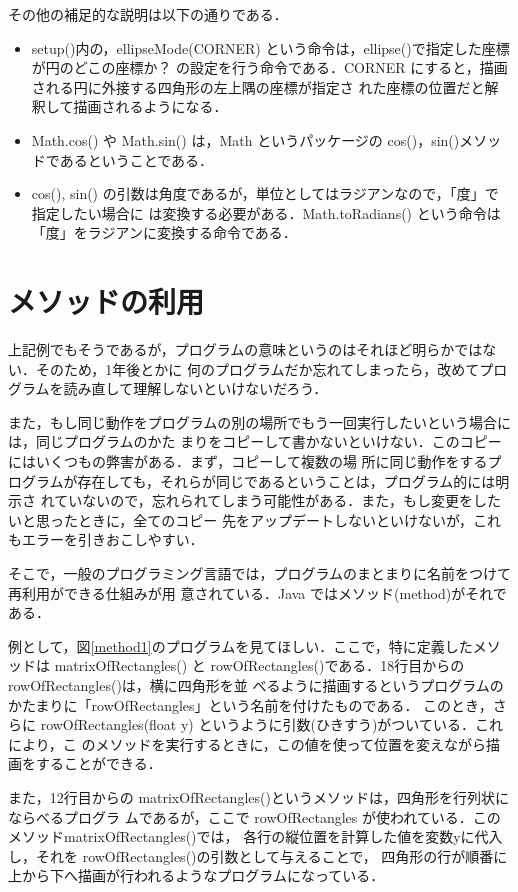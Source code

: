 \documentclass[a4paper,xelatex,ja=standard]{bxjsarticle}
\begin{document}
その他の補足的な説明は以下の通りである．
\begin{itemize}
  \item setup()内の，ellipseMode(CORNER) という命令は，ellipse()で指定した座標が円のどこの座標か？
    の設定を行う命令である．CORNER にすると，描画される円に外接する四角形の左上隅の座標が指定さ
    れた座標の位置だと解釈して描画されるようになる．
  \item Math.cos() や Math.sin() は，Math というパッケージの cos()，sin()メソッドであるということである．
  \item cos(), sin() の引数は角度であるが，単位としてはラジアンなので，「度」で指定したい場合に
    は変換する必要がある．Math.toRadians() という命令は「度」をラジアンに変換する命令である．
\end{itemize}

\section{メソッドの利用}


上記例でもそうであるが，プログラムの意味というのはそれほど明らかではない．そのため，1年後とかに
何のプログラムだか忘れてしまったら，改めてプログラムを読み直して理解しないといけないだろう．

また，もし同じ動作をプログラムの別の場所でもう一回実行したいという場合には，同じプログラムのかた
まりをコピーして書かないといけない．このコピーにはいくつもの弊害がある．まず，コピーして複数の場
所に同じ動作をするプログラムが存在しても，それらが同じであるということは，プログラム的には明示さ
れていないので，忘れられてしまう可能性がある．また，もし変更をしたいと思ったときに，全てのコピー
先をアップデートしないといけないが，これもエラーを引きおこしやすい．

そこで，一般のプログラミング言語では，プログラムのまとまりに名前をつけて再利用ができる仕組みが用
意されている．Java ではメソッド(method)がそれである．

例として，図\ref{method1}のプログラムを見てほしい．ここで，特に定義したメソッドは
matrixOfRectangles() と rowOfRectangles()である．18行目からのrowOfRectangles()は，横に四角形を並
べるように描画するというプログラムのかたまりに「rowOfRectangles」という名前を付けたものである．
このとき，さらに rowOfRectangles(float y) というように引数(ひきすう)がついている．これにより，こ
のメソッドを実行するときに，この値を使って位置を変えながら描画をすることができる．

また，12行目からの matrixOfRectangles()というメソッドは，四角形を行列状にならべるプログラ
ムであるが，ここで rowOfRectangles が使われている．このメソッドmatrixOfRectangles()では，
各行の縦位置を計算した値を変数yに代入し，それを rowOfRectangles()の引数として与えることで，
四角形の行が順番に上から下へ描画が行われるようなプログラムになっている．
\end{document}
